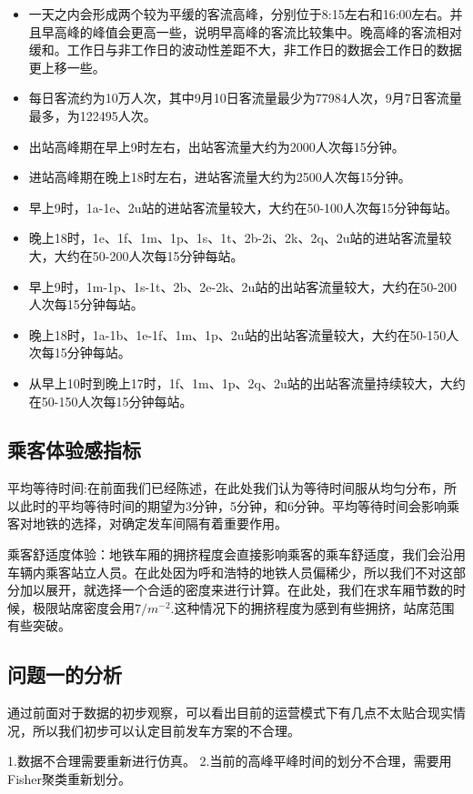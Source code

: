 \documentclass[12pt,a4paper]{mcmthesis}
\begin{document}
\begin{itemize}
	\item 一天之内会形成两个较为平缓的客流高峰，分别位于8:15左右和16:00左右。并且早高峰的峰值会更高一些，说明早高峰的客流比较集中。晚高峰的客流相对缓和。工作日与非工作日的波动性差距不大，非工作日的数据会工作日的数据更上移一些。
	\item 每日客流约为10万人次，其中9月10日客流量最少为77984人次，9月7日客流量最多，为122495人次。
	\item 出站高峰期在早上9时左右，出站客流量大约为2000人次每15分钟。
	\item 进站高峰期在晚上18时左右，进站客流量大约为2500人次每15分钟。
	\item 早上9时，1a-1e、2u站的进站客流量较大，大约在50-100人次每15分钟每站。
	\item 晚上18时，1e、1f、1m、1p、1s、1t、2b-2i、2k、2q、2u站的进站客流量较大，大约在50-200人次每15分钟每站。
	\item 早上9时，1m-1p、1s-1t、2b、2e-2k、2u站的出站客流量较大，大约在50-200人次每15分钟每站。
	\item 晚上18时，1a-1b、1e-1f、1m、1p、2u站的出站客流量较大，大约在50-150人次每15分钟每站。
	\item 从早上10时到晚上17时，1f、1m、1p、2q、2u站的出站客流量持续较大，大约在50-150人次每15分钟每站。
\end{itemize}

\subsection{乘客体验感指标}
平均等待时间:在前面我们已经陈述，在此处我们认为等待时间服从均匀分布，所以此时的平均等待时间的期望为3分钟，5分钟，和6分钟。平均等待时间会影响乘客对地铁的选择，对确定发车间隔有着重要作用。

乘客舒适度体验：地铁车厢的拥挤程度会直接影响乘客的乘车舒适度，我们会沿用车辆内乘客站立人员。在此处因为呼和浩特的地铁人员偏稀少，所以我们不对这部分加以展开，就选择一个合适的密度来进行计算。在此处，我们在求车厢节数的时候，极限站席密度会用$7/m^{-2}$.这种情况下的拥挤程度为感到有些拥挤，站席范围有些突破。

\subsection{问题一的分析}

 通过前面对于数据的初步观察，可以看出目前的运营模式下有几点不太贴合现实情况，所以我们初步可以认定目前发车方案的不合理。

 1.数据不合理需要重新进行仿真。
 2.当前的高峰平峰时间的划分不合理，需要用Fisher聚类重新划分。
\end{document}
